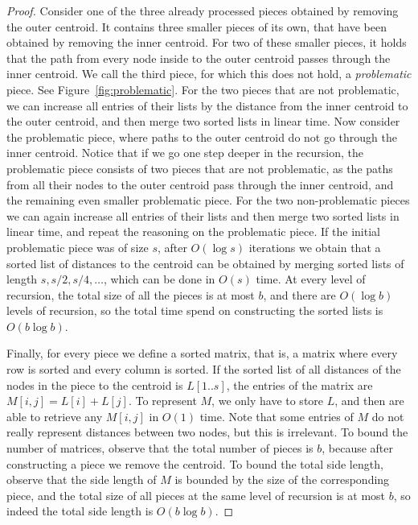 \documentclass[11pt,a4paper]{article}
\theoremstyle{definition}
\theoremstyle{remark}
\begin{document}
\begin{proof}
Consider one of the three already processed pieces obtained by removing the outer centroid. It contains three smaller pieces of its own,
that have been obtained by removing the inner centroid.
For two of these smaller pieces, it holds that the path from every node inside to the outer centroid passes through the inner centroid.
We call the third piece, for which this does not hold, a \textit{problematic} piece. See Figure~\ref{fig:problematic}. For the two pieces that are not problematic, we can 
increase all entries of their lists by the distance from the inner centroid to the outer centroid, and then merge two sorted lists in linear time.
Now consider the problematic piece, where paths to the outer centroid do not go through the inner centroid. Notice that if we go one step deeper
in the recursion, the problematic piece consists of two pieces that are not problematic, as the paths from all their nodes to the outer centroid
pass through the inner centroid, and the remaining even smaller problematic piece. For the two non-problematic pieces we can again
increase all entries of their lists and then merge two sorted lists in linear time, and repeat the reasoning on the problematic piece.
If the initial problematic piece was of size $s$, after $O(\log s)$ iterations we obtain that a sorted list of distances to the centroid can be
obtained by merging sorted lists of length $s,s/2,s/4,\ldots$, which can be done in $O(s)$ time. At every level of recursion, 
the total size of all the pieces is at most $b$, and there are $O(\log b)$ levels of recursion, so the total time spend on constructing
the sorted lists is $O(b\log b)$.

Finally, for every piece we define a sorted matrix, that is, a matrix where every row is sorted and every column is sorted. If the sorted list of all distances of the nodes in the piece to the
centroid is $L[1..s]$, the entries of the matrix are $M[i,j]=L[i]+L[j]$. To represent $M$, we only have to store $L$, and then are able to
retrieve any $M[i,j]$ in $O(1)$ time. Note that some entries of $M$ do not really represent distances between two nodes, but this is irrelevant.
To bound the number of matrices, observe that the total number of pieces is $b$, because after constructing a piece we remove the centroid.
To bound the total side length, observe that the side length of $M$ is bounded by the size of the corresponding piece, and the total size
of all pieces at the same level of recursion is at most $b$, so indeed the total side length is $O(b\log b)$.
\end{proof}
\end{document}
